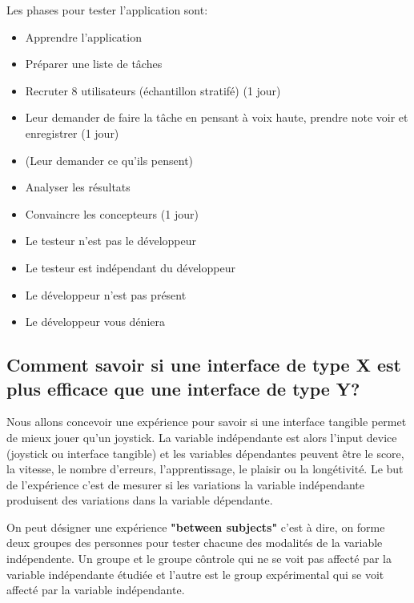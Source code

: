 Les phases pour tester l'application sont:

\begin{itemize}
\item Apprendre l'application
\item Pr\'eparer une liste de t\^aches
\item Recruter 8 utilisateurs (\'echantillon stratif\'e) (1 jour)
\item Leur demander de faire la t\^ache en pensant \`a voix haute, prendre note voir et enregistrer (1  jour)
\item (Leur demander ce qu'ils pensent)
\item Analyser les r\'esultats
\item Convaincre les concepteurs (1 jour)
\end{itemize}

\begin{itemize}
\item Le testeur n'est pas le d\'eveloppeur
\item Le testeur est ind\'ependant du d\'eveloppeur
\item Le d\'eveloppeur n'est pas pr\'esent
\item Le d\'eveloppeur vous d\'eniera
\end{itemize}

\subsection{Comment savoir si une interface de type X est plus efficace que une interface de type Y?}

Nous allons concevoir une exp\'erience pour savoir si une interface tangible permet de mieux jouer qu'un joystick. La variable ind\'ependante est alors l'input device (joystick ou interface tangible) et les variables d\'ependantes peuvent \^etre le score, la vitesse, le nombre d'erreurs, l'apprentissage, le plaisir ou la long\'etivit\'e. Le but de l'exp\'erience c'est de mesurer si les variations la variable ind\'ependante produisent des variations dans la variable d\'ependante.

On peut d\'esigner une exp\'erience \textbf{"between subjects"} c'est \`a dire, on forme deux groupes des personnes pour tester chacune des modalit\'es de la variable ind\'ependente. Un groupe et le groupe c\^ontrole qui ne se voit pas affect\'e par la variable ind\'ependante \'etudi\'ee et l'autre est le group exp\'erimental qui se voit affect\'e par la variable ind\'ependante.

